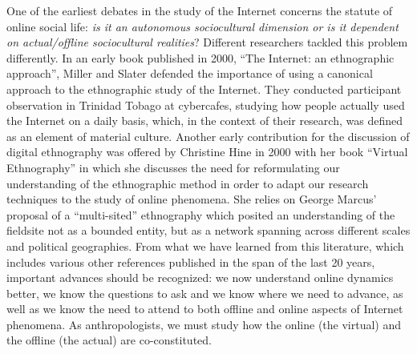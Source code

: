 \documentclass[10pt,letter,oneside]{scrartcl}
\begin{document}
One of the earliest debates in the study of the Internet concerns the
statute of online social life: \emph{is it an autonomous sociocultural
  dimension or is it dependent on actual/offline sociocultural
  realities}? Different researchers tackled this problem
differently. In an early book published in 2000, ``The Internet: an
ethnographic approach'', Miller and Slater defended the importance of
using a canonical approach to the ethnographic study of the
Internet.  They conducted participant observation in Trinidad Tobago at
cybercafes, studying how people actually used the Internet on a daily
basis, which, in the context of their research, was defined as an
element of material culture. Another early contribution for the
discussion of digital ethnography was offered by Christine Hine in
2000 with her book ``Virtual Ethnography'' in which she discusses the
need for reformulating our understanding of the ethnographic method in
order to adapt our research techniques to the study of online
phenomena.  She relies on George Marcus' proposal of a ``multi-sited''
ethnography which posited an understanding of the fieldsite not as a
bounded entity, but as a network spanning across different scales and
political geographies. From what we have learned from this literature,
which includes various other references published in the span of the
last 20 years, important advances should be recognized: we now
understand online dynamics better, we know the questions to ask and we
know where we need to advance, as well as we know the need to attend
to both offline and online aspects of Internet phenomena. As
anthropologists, we must study how the online (the virtual) and the
offline (the actual) are co-constituted.
\end{document}
